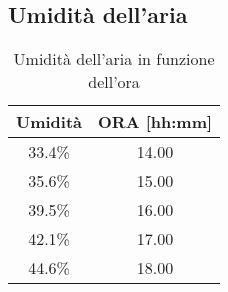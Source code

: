 \begin{appendices}
\section{Umidità dell'aria}

\begin{table}[H]
	\centering
	\begin{tabular}{|c|c|} \hline
		\textbf{Umidità} & \textbf{ORA {[hh:mm]} }  \\ \hline
		33.4\% & 14.00  \\ \hline
		35.6\% & 15.00  \\ \hline
		39.5\% & 16.00  \\ \hline
		42.1\% & 17.00  \\ \hline
		44.6\% & 18.00  \\ \hline
	\end{tabular}
	\caption{Umidità dell'aria in funzione dell'ora}
\end{table}
\end{appendices}
